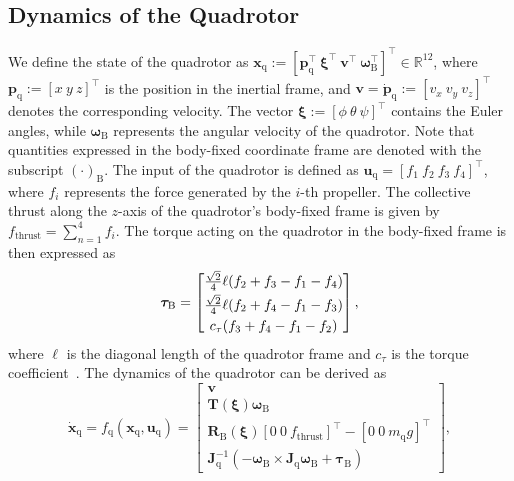 \documentclass[conference,preprint]{IEEEtran}
\begin{document}
\subsection{Dynamics of the Quadrotor}
We define the state of the quadrotor as $\bm{x}_\text{q} := \left[\bm{p}_\text{q}^\top \ \bm{\xi}^\top \ \bm{v}^\top \ \bm{\omega}_\text{B}^\top \right]^\top \in \mathbb{R}^{12} $,
where $\bm{p}_\text{q}:= \left[x\ y\ z\right]^\top$ is the position in the inertial frame, and $\bm{v}=\dot{\bm{p}}_\text{q}:=\left[v_x \ v_y \ v_z \right]^\top$ denotes the corresponding velocity. The vector $\bm{\xi}:=\left[\phi \ \theta \ \psi\right]^\top$ contains the Euler angles, while $\bm{\omega}_\text{B}$ represents the angular velocity of the quadrotor. 
Note that quantities expressed in the body-fixed coordinate frame are denoted with the subscript $(\cdot)_\text{B}$.  
The input of the quadrotor is defined as 
$\bm{u}_\text{q} = \left[f_{\text{1}} \ f_{\text{2}} \ f_{\text{3}} \ f_{\text{4}}\right]^\top$, where $f_{i}$ represents the force generated by the $i$-th propeller. The collective thrust along the $z$-axis of the quadrotor's body-fixed frame is given by $f_\text{thrust} = \sum_{n = 1}^{4}f_{i}$. 
The torque acting on the quadrotor in the body-fixed frame is then expressed as
\begin{equation*}
  \label{eq:torque_motors}
  \bm{\tau}_{\text{B}}=\begin{bmatrix}
    \frac{\sqrt{2}}{4}\ell (f_\text{2}+f_\text{3}-f_\text{1}-f_\text{4}) \vspace{1mm} \\ \frac{\sqrt{2}}{4}\ell (f_\text{2}+f_\text{4}-f_\text{1}-f_\text{3}) \vspace{1mm}\\ c_\tau (f_\text{3}+f_\text{4}-f_\text{1}-f_\text{2})
  \end{bmatrix},
\end{equation*}
where $\ell$ is the diagonal length of the quadrotor frame and $c_\tau$ is the torque coefficient~\cite{Quan2017}. 
The dynamics of the quadrotor can be derived as
\begin{equation}
  \label{eq:quad_system_dyanmics}
  \dot{\bm{x}}_\text{q} = f_\text{q}(\bm{x}_\text{q}, \bm{u}_\text{q})= \begin{bmatrix}
    \bm{v} \\
    \bm{T}(\bm{\xi})\bm{\omega}_\text{B} \\
    \bm{R}_\text{B}(\bm{\xi}) \left[0 \ 0 \ f_\text{thrust}\right]^\top - \left[0 \ 0 \ m_\text{q}g\right]^\top \\
    \bm{J}_\text{q}^{-1}(-\bm{\omega}_\text{B}\times\bm{J}_\text{q}\bm{\omega}_\text{B} + \bm{\tau}_\text{B})
  \end{bmatrix},
\end{equation}
\end{document}
